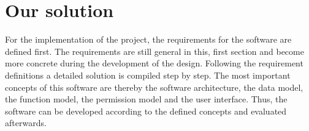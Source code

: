 \section{Our solution}
    \label{sec:contribution}
    For the implementation of the project, the requirements for the software are defined first. The requirements are still general in this, first section and become more concrete during the development of the design. Following the requirement definitions a detailed solution is compiled step by step. The most important concepts of this software are thereby the software architecture, the data model, the function model, the permission model and the user interface. Thus, the software can be developed according to the defined concepts and evaluated afterwards.


